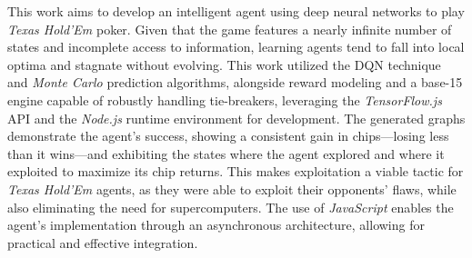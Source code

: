This work aims to develop an intelligent agent using deep neural networks to play \textit{Texas Hold'Em} poker. Given that the game features a nearly infinite number of states and incomplete access to information, learning agents tend to fall into local optima and stagnate without evolving. This work utilized the \gls{DQN} technique and \textit{Monte Carlo} prediction algorithms, alongside reward modeling and a base-15 engine capable of robustly handling tie-breakers, leveraging the \textit{TensorFlow.js} \gls{API} and the \textit{Node.js} runtime environment for development. The generated graphs demonstrate the agent's success, showing a consistent gain in chips---losing less than it wins---and exhibiting the states where the agent explored and where it exploited to maximize its chip returns. This makes exploitation a viable tactic for \textit{Texas Hold'Em} agents, as they were able to exploit their opponents' flaws, while also eliminating the need for supercomputers. The use of \textit{JavaScript} enables the agent's implementation through an asynchronous architecture, allowing for practical and effective integration.

